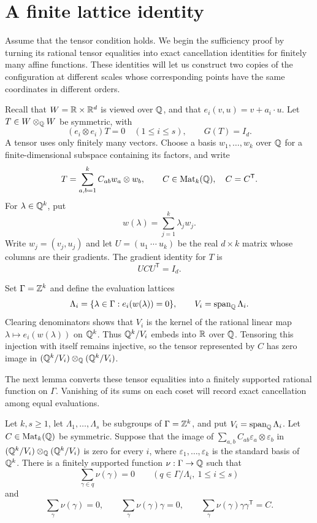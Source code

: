 \section{A finite lattice identity}\label{stencil:section}

Assume that the tensor condition holds. We begin the sufficiency proof by
turning its rational tensor equalities into exact cancellation identities
for finitely many affine functions. These identities will let us construct
two copies of the configuration at different scales whose corresponding
points have the same coordinates in different orders.

Recall that $W=\mathbb R\times\mathbb R^d$ is viewed over $\mathbb Q$, and that
$e_i(v,u)=v+a_i\cdot u$. Let $T\in W\otimes_{\mathbb Q}W$ be symmetric, with
\[
 (e_i\otimes e_i)T=0\quad(1\leq i\leq s),
 \qquad G(T)=I_d.
\]
A tensor uses only finitely many vectors. Choose a basis
$w_1,\ldots,w_k$ over $\mathbb Q$ for a finite-dimensional subspace containing
its factors, and write
\[
 T=\sum_{a,b=1}^k C_{ab}w_a\otimes w_b,
 \qquad C\in\operatorname{Mat}_k(\mathbb Q),\quad C=C^{\mathsf T}.
\]
For $\lambda\in\mathbb Q^k$, put
\[
 w(\lambda)=\sum_{j=1}^k\lambda_jw_j.
\]
Write $w_j=(v_j,u_j)$ and let $U=(u_1\ \cdots\ u_k)$ be the real
$d\times k$ matrix whose columns are their gradients. The gradient
identity for $T$ is
\begin{equation}\label{stencil:gram}
 UCU^{\mathsf T}=I_d.
\end{equation}

Set $\Gamma=\mathbb Z^k$ and define the evaluation lattices
\[
 \Lambda_i=\{\lambda\in\Gamma:e_i(w(\lambda))=0\},
 \qquad V_i=\operatorname{span}_{\mathbb Q}\Lambda_i.
\]
Clearing denominators shows that $V_i$ is the kernel of the rational
linear map $\lambda\mapsto e_i(w(\lambda))$ on $\mathbb Q^k$.
Thus $\mathbb Q^k/V_i$ embeds into $\mathbb R$ over $\mathbb Q$. Tensoring this injection
with itself remains injective, so the tensor represented by $C$ has zero
image in $(\mathbb Q^k/V_i)\otimes_{\mathbb Q}(\mathbb Q^k/V_i)$.

The next lemma converts these tensor equalities into a finitely
supported rational function on $\Gamma$. Vanishing of its sums on each
coset will record exact cancellation among equal evaluations.

\begin{lemma}\label{stencil:finite}
Let $k,s\geq1$, let $\Lambda_1,\ldots,\Lambda_s$ be subgroups of
$\Gamma=\mathbb Z^k$, and put $V_i=\operatorname{span}_{\mathbb Q}\Lambda_i$.
Let $C\in\operatorname{Mat}_k(\mathbb Q)$ be symmetric. Suppose that the
image of
$\sum_{a,b}C_{ab}\varepsilon_a\otimes\varepsilon_b$
in $(\mathbb Q^k/V_i)\otimes_{\mathbb Q}(\mathbb Q^k/V_i)$ is zero for every $i$,
where $\varepsilon_1,\ldots,\varepsilon_k$ is the standard basis of
$\mathbb Q^k$. There is a finitely supported function $\nu:\Gamma\to\mathbb Q$
such that
\begin{equation}\label{stencil:cosets}
 \sum_{\gamma\in q}\nu(\gamma)=0
 \qquad(q\in\Gamma/\Lambda_i,\ 1\leq i\leq s)
\end{equation}
and
\begin{equation}\label{stencil:moments}
 \sum_\gamma\nu(\gamma)=0,\qquad
 \sum_\gamma\nu(\gamma)\gamma=0,\qquad
 \sum_\gamma\nu(\gamma)\gamma\gamma^{\mathsf T}=C.
\end{equation}
\end{lemma}

